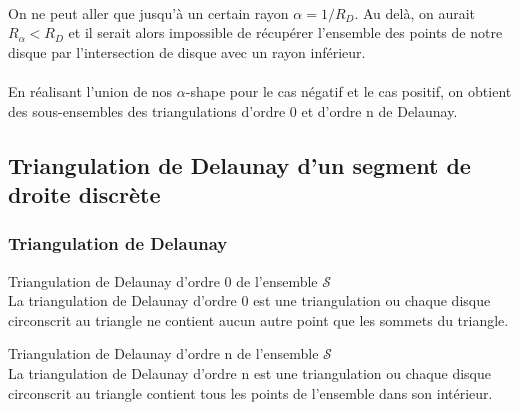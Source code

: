 \paragraph{}
On ne peut aller que jusqu'à un certain rayon $\alpha = 1/R_D$. Au delà, on aurait $R_{\alpha} < R_D$ et il serait alors impossible de récupérer l'ensemble des points de notre disque par l'intersection de disque avec un rayon inférieur.

\paragraph{}
En réalisant l'union de nos $\alpha$-shape pour le cas négatif et le cas positif, on obtient des sous-ensembles des triangulations d'ordre 0 et d'ordre n de Delaunay. 

\subsection{Triangulation de Delaunay d'un segment de droite discrète}

\subsubsection{Triangulation de Delaunay}


\begin{Definition}{Triangulation de Delaunay d'ordre 0 de l'ensemble $\mathcal{S}$}\\
\label{def:tri-del-0}
  La triangulation de Delaunay d'ordre 0 est une triangulation ou chaque disque circonscrit au triangle ne contient aucun autre point que les sommets du triangle.
\end{Definition}

\begin{Definition}{Triangulation de Delaunay d'ordre n de l'ensemble $\mathcal{S}$}\\
\label{def:tri-del-n}
  La triangulation de Delaunay d'ordre n est une triangulation ou chaque disque circonscrit au triangle contient tous les points de l'ensemble dans son intérieur.
\end{Definition}

